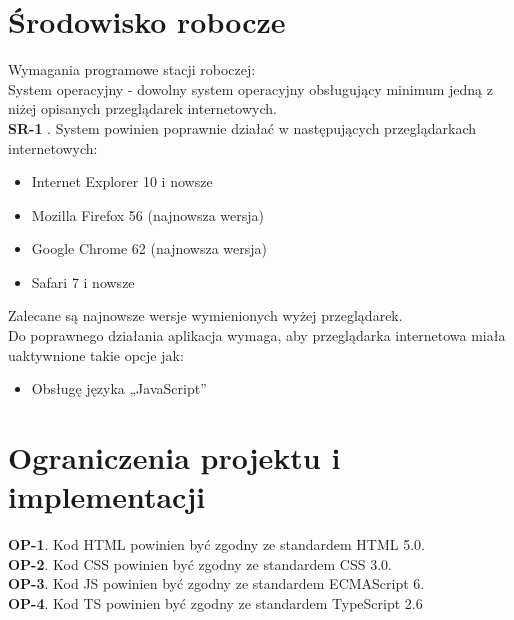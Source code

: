 \documentclass{scrreprt}
\begin{document}
\newpage
\section{ Środowisko robocze}
Wymagania programowe stacji roboczej:\\
System operacyjny - dowolny system operacyjny obsługujący minimum jedną z niżej opisanych przeglądarek internetowych.\\

\textbf{\textcolor{myBlue}{SR-1}} . System powinien poprawnie działać w następujących przeglądarkach internetowych:
\begin{itemize}[label={--}]
\item{Internet Explorer 10 i nowsze}
\item{Mozilla Firefox 56 (najnowsza wersja)}
\item{Google Chrome 62 (najnowsza wersja)}
\item{Safari 7 i nowsze}
\end{itemize}
Zalecane są najnowsze wersje wymienionych wyżej przeglądarek.\\

Do poprawnego działania aplikacja wymaga, aby przeglądarka internetowa miała uaktywnione takie opcje jak: 
\begin{itemize}[label={--}]
\item{Obsługę języka „JavaScript”}
\end{itemize} 

\section{Ograniczenia projektu i implementacji} 
\textbf{\textcolor{myBlue}{OP-1}}. Kod HTML powinien być zgodny ze standardem HTML 5.0. \\
\textbf{\textcolor{myBlue}{OP-2}}. Kod CSS powinien być zgodny ze standardem CSS 3.0. \\
\textbf{\textcolor{myBlue}{OP-3}}. Kod JS powinien być zgodny ze standardem ECMAScript 6. \\
\textbf{\textcolor{myBlue}{OP-4}}. Kod TS powinien być zgodny ze standardem TypeScript 2.6 \\
\end{document}
